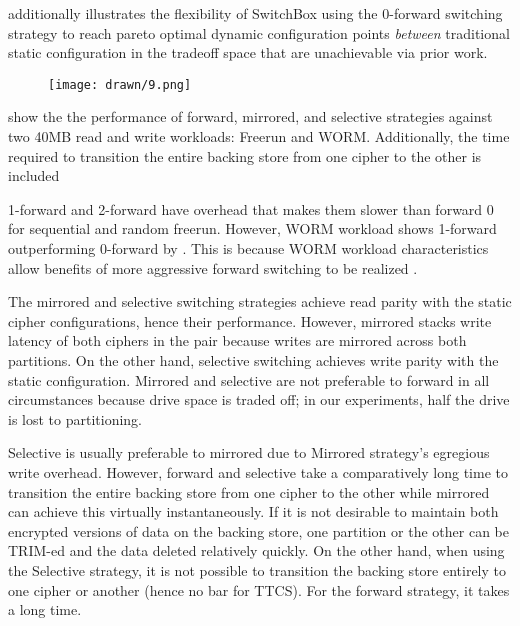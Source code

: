  additionally illustrates the flexibility of
SwitchBox using the 0-forward switching strategy to reach pareto optimal dynamic
configuration points \emph{between} traditional static configuration in the
tradeoff space that are unachievable via prior work.

\begin{figure}[ht]
 \centering
  \texttt{[image: drawn/9.png]}
   \caption{}\label{fig:strategy-vs-strategy}
\end{figure}

 show the the performance of forward, mirrored, and
selective strategies against two 40MB read and write workloads: Freerun and
WORM.  Additionally, the time required to
transition the entire backing store from one cipher to the other is included

1-forward and 2-forward have overhead that makes them slower than forward 0 for
sequential and random freerun. However, WORM workload shows 1-forward
outperforming 0-forward by . This is
because WORM workload characteristics allow benefits of more aggressive forward
switching to be realized .

The mirrored and selective switching strategies achieve read parity with the
static cipher configurations, hence their performance. However, mirrored stacks
write latency of both ciphers in the pair because writes are mirrored across
both partitions. On the other hand, selective switching achieves write parity
with the static configuration. Mirrored and selective are not preferable to
forward in all circumstances because drive space is traded off; in our
experiments, half the drive is lost to partitioning.


Selective is usually preferable to mirrored due to Mirrored strategy's egregious
write overhead. However, forward and selective take a comparatively long time to
transition the entire backing store from one cipher to the other while mirrored
can achieve this virtually instantaneously. If it is not desirable to maintain
both encrypted versions of data on the backing store, one partition or the other
can be TRIM-ed and the data deleted relatively quickly. On the other hand, when
using the Selective strategy, it is not possible to transition the backing store
entirely to one cipher or another (hence no bar for TTCS). For the forward
strategy, it takes a long time. 
